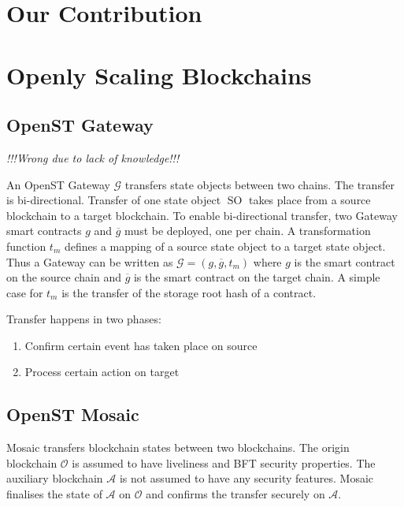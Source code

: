 \documentclass[12pt,a4paper,draft]{article}
\newcommand{\A}{\mathcal{A}}
\newcommand{\OC}{\mathcal{O}}
\newcommand{\G}{\mathcal{G}}
\newcommand{\SO}{\operatorname{SO}}
\begin{document}
\section{Our Contribution}

\section{Openly Scaling Blockchains}

\subsection{OpenST Gateway}
\label{subsec:gateway}

\emph{!!!Wrong due to lack of knowledge!!!}


An OpenST Gateway $\G$ transfers state objects between two chains.
The transfer is bi-directional.
Transfer of one state object $\SO$ takes place from a source blockchain to a target blockchain.
To enable bi-directional transfer, two Gateway smart contracts $g$ and $\overline{g}$ must be deployed, one per chain.
A transformation function $t_m$ defines a mapping of a source state object to a target state object.
Thus a Gateway can be written as $\G = (g, \overline{g}, t_m)$ where $g$ is the smart contract on the source chain and $\overline{g}$ is the smart contract on the target chain.
A simple case for $t_m$ is the transfer of the storage root hash of a contract.

Transfer happens in two phases:
\begin{enumerate}
	\item Confirm certain event has taken place on source
	\item Process certain action on target
\end{enumerate}


\subsection{OpenST Mosaic}
\label{subsec:mosaic}

Mosaic transfers blockchain states between two blockchains.
The origin blockchain $\OC$ is assumed to have liveliness and BFT security properties.
The auxiliary blockchain $\A$ is not assumed to have any security features.
Mosaic finalises the state of $\A$ on $\OC$ and confirms the transfer securely on $\A$.
\end{document}
